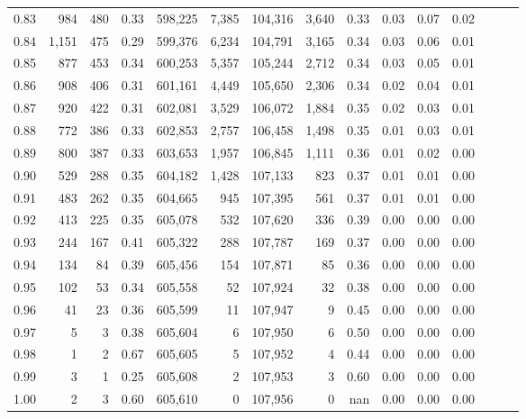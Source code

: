 \begin{tabular}{rrrrrrrrrrrrrrr}
0.83 &     984 &    480 &  0.33 &  598,225 &    7,385 &  104,316 &    3,640 &  0.33 &  0.03 &  0.07 &      0.02 \\
0.84 &   1,151 &    475 &  0.29 &  599,376 &    6,234 &  104,791 &    3,165 &  0.34 &  0.03 &  0.06 &      0.01 \\
0.85 &     877 &    453 &  0.34 &  600,253 &    5,357 &  105,244 &    2,712 &  0.34 &  0.03 &  0.05 &      0.01 \\
0.86 &     908 &    406 &  0.31 &  601,161 &    4,449 &  105,650 &    2,306 &  0.34 &  0.02 &  0.04 &      0.01 \\
0.87 &     920 &    422 &  0.31 &  602,081 &    3,529 &  106,072 &    1,884 &  0.35 &  0.02 &  0.03 &      0.01 \\
0.88 &     772 &    386 &  0.33 &  602,853 &    2,757 &  106,458 &    1,498 &  0.35 &  0.01 &  0.03 &      0.01 \\
0.89 &     800 &    387 &  0.33 &  603,653 &    1,957 &  106,845 &    1,111 &  0.36 &  0.01 &  0.02 &      0.00 \\
0.90 &     529 &    288 &  0.35 &  604,182 &    1,428 &  107,133 &      823 &  0.37 &  0.01 &  0.01 &      0.00 \\
0.91 &     483 &    262 &  0.35 &  604,665 &      945 &  107,395 &      561 &  0.37 &  0.01 &  0.01 &      0.00 \\
0.92 &     413 &    225 &  0.35 &  605,078 &      532 &  107,620 &      336 &  0.39 &  0.00 &  0.00 &      0.00 \\
0.93 &     244 &    167 &  0.41 &  605,322 &      288 &  107,787 &      169 &  0.37 &  0.00 &  0.00 &      0.00 \\
0.94 &     134 &     84 &  0.39 &  605,456 &      154 &  107,871 &       85 &  0.36 &  0.00 &  0.00 &      0.00 \\
0.95 &     102 &     53 &  0.34 &  605,558 &       52 &  107,924 &       32 &  0.38 &  0.00 &  0.00 &      0.00 \\
0.96 &      41 &     23 &  0.36 &  605,599 &       11 &  107,947 &        9 &  0.45 &  0.00 &  0.00 &      0.00 \\
0.97 &       5 &      3 &  0.38 &  605,604 &        6 &  107,950 &        6 &  0.50 &  0.00 &  0.00 &      0.00 \\
0.98 &       1 &      2 &  0.67 &  605,605 &        5 &  107,952 &        4 &  0.44 &  0.00 &  0.00 &      0.00 \\
0.99 &       3 &      1 &  0.25 &  605,608 &        2 &  107,953 &        3 &  0.60 &  0.00 &  0.00 &      0.00 \\
1.00 &       2 &      3 &  0.60 &  605,610 &        0 &  107,956 &        0 &   nan &  0.00 &  0.00 &      0.00 \\
\bottomrule
\end{tabular}
